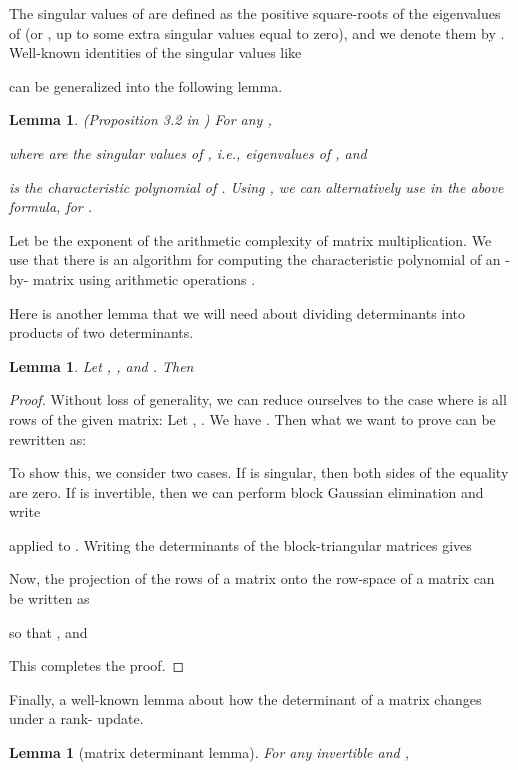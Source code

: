 \documentclass[11pt]{article}
\newtheorem{lemma}[theorem]{Lemma}
\begin{document}
The singular values of  are defined as the positive square-roots of the eigenvalues of  (or , up to some extra singular values equal to zero), and we denote them by . Well-known identities of the singular values like

can be generalized into the following lemma.


\begin{lemma} (Proposition 3.2 in \cite{DRVW}) \label{lemma:char-poly}
For any ,

where  are the singular values of , i.e., eigenvalues of , and

is the characteristic polynomial of . Using , we can alternatively use  in the above formula, for .
\end{lemma}

Let  be the exponent of the arithmetic complexity of matrix multiplication. We use that there is an algorithm for computing the characteristic polynomial of an -by- matrix using  arithmetic operations \cite[Section 16.6]{ACT}.

Here is another lemma that we will need about dividing determinants into products of two determinants.
\begin{lemma} \label{lemma:det-division}
Let , ,  and . Then

\end{lemma}
\begin{proof}
Without loss of generality, we can reduce ourselves to the case where  is all rows of the given matrix: Let ,  . We have . Then what we want to prove can be rewritten as:

To show this, we consider two cases. If  is singular, then both sides of the equality are zero. If  is invertible, then we can perform block Gaussian elimination and write

applied to . Writing the determinants of the block-triangular matrices gives

Now, the projection of the rows of a matrix  onto the row-space of a matrix  can be written as

so that ,  and

This completes the proof.
\end{proof}

Finally, a well-known lemma about how the determinant of a matrix changes under a rank- update.
\begin{lemma}[matrix determinant lemma] \label{lemma:matrix-det}
For any invertible  and ,

\end{lemma}
\end{document}

